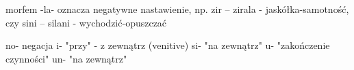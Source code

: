 morfem -la- oznacza negatywne nastawienie, np. zir -- zirala -
jaskółka-samotność, czy sini -- silani - wychodzić-opuszczać

no- negacja
i- "przy" - z zewnątrz (venitive)
si- "na zewnątrz"
u- "zakończenie czynności"
un- "na zewnątrz"
